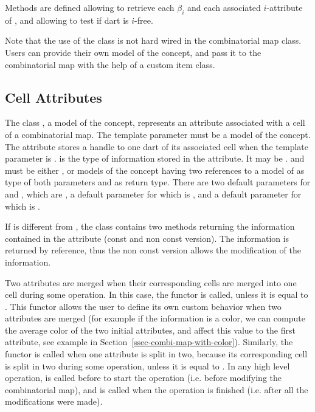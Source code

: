 Methods are defined allowing to retrieve each $\beta_i$ and each
associated $i$-attribute of , and allowing to test if 
dart is $i$-free.

Note that the use of the  class is not hard wired in
the combinatorial map class. Users can provide their own model of the
 concept, and pass it to the combinatorial map with the help
of a custom item class.

\subsection{Cell Attributes}\label{ssec-attributes}

The class , a
model of the  concept, represents an attribute
associated with a cell of a combinatorial map.  The 
template parameter  must be a model of the
 concept.  The attribute stores a handle to one
dart of its associated cell when the template parameter  is
.
 is the type of information stored in the attribute. It may
be .   and  must be either
, or models of the  concept
having two references to a model of  as type of
both parameters and  as return type.  There are two default
parameters for  and , which are
, a default parameter for  which is
, and a default parameter for  which is
.

If  is different from , the class
 contains two methods  returning the
information contained in the attribute (const and non const version).
The information is returned by reference, thus the non const version
allows the modification of the information.

Two attributes are merged when their corresponding cells are merged
into one cell during some operation. In this case, the functor
 is called, unless it is equal to .
This functor allows the user to define its own custom behavior when
two attributes are merged (for example if the information is a color,
we can compute the average color of the two initial attributes, and
affect this value to the first attribute, see example in
Section~\ref{ssec-combi-map-with-color}).  Similarly, the functor
 is called when one attribute is split in two, because
its corresponding cell is split in two during some operation, unless
it is equal to .  In any high level operation,
 is called before to start the operation (i.e. before
modifying the combinatorial map), and  is called when the
operation is finished (i.e. after all the modifications were made).

